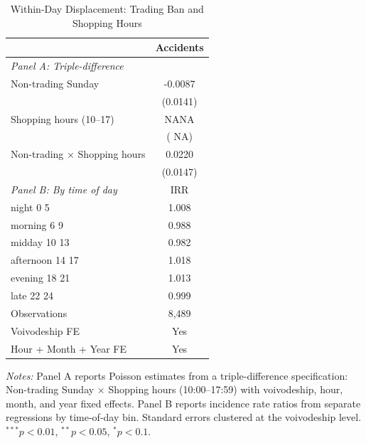 \begin{table}[htbp]
\centering
\caption{Within-Day Displacement: Trading Ban and Shopping Hours}
\label{tab:ddd}
\begin{tabular}{lc}
\hline\hline
 & Accidents \\
\hline
\emph{Panel A: Triple-difference} & \\
  Non-trading Sunday & -0.0087 \\
   & (0.0141) \\
  Shopping hours (10--17) &    NANA \\
   & (   NA) \\
  Non-trading $\times$ Shopping hours & 0.0220 \\
   & (0.0147) \\
\hline
\emph{Panel B: By time of day} & IRR \\
  night 0 5 & 1.008 \\
  morning 6 9 & 0.988 \\
  midday 10 13 & 0.982 \\
  afternoon 14 17 & 1.018 \\
  evening 18 21 & 1.013 \\
  late 22 24 & 0.999 \\
\hline
  Observations & 8,489 \\
  Voivodeship FE & Yes \\
  Hour + Month + Year FE & Yes \\
\hline\hline
\end{tabular}
\begin{tablenotes}[flushleft]
\small
\item \textit{Notes:} Panel A reports Poisson estimates from a triple-difference specification: Non-trading Sunday $\times$ Shopping hours (10:00--17:59) with voivodeship, hour, month, and year fixed effects. Panel B reports incidence rate ratios from separate regressions by time-of-day bin. Standard errors clustered at the voivodeship level. $^{***}p<0.01$, $^{**}p<0.05$, $^{*}p<0.1$.
\end{tablenotes}
\end{table}

